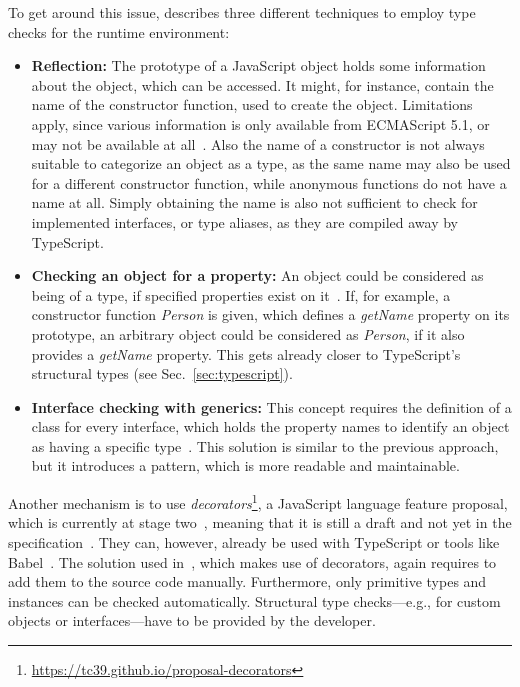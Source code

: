 \pagebreak
\noindent
To get around this issue, \citeauthor{MasteringTypeScript:Rozentals:2015} describes three different techniques to employ type checks for the runtime environment:
\begin{itemize}
  \item \textbf{Reflection:} The prototype of a JavaScript object holds 
some information about the object, which can be accessed. It might, for instance, contain the name of the constructor function, used to create the object. Limitations apply, since various information is only available from ECMAScript 5.1, or may not be available at all~\cite[pp.~98--100]{MasteringTypeScript:Rozentals:2015}. Also the name of a constructor is not always suitable to categorize an object as a type, as the same name may also be used for a different constructor function, while anonymous functions do not have a name at all. Simply obtaining the name is also not sufficient to check for implemented interfaces, or type aliases, as they are compiled away by TypeScript.
  \item \textbf{Checking an object for a property:} An object could be considered 
as being of a type, if specified properties exist on it~\cites[pp.~101--102]{MasteringTypeScript:Rozentals:2015}[pp.~18--20]{ProJavaScriptDesignPatterns:HarmesDiaz:2008}. If, for example, a constructor function \emph{Person} is given, which defines a \emph{getName} property on its prototype, an arbitrary object could be considered as \emph{Person}, if it also provides a \emph{getName} property. This gets already closer to TypeScript's structural types (see Sec.~\ref{sec:typescript}).
  \item \textbf{Interface checking with generics:} This concept requires the definition of a class for every interface, which holds the property names to identify an object as having a specific type~\cites[pp.~102--105]{MasteringTypeScript:Rozentals:2015}[pp.~17--19]{ProJavaScriptDesignPatterns:HarmesDiaz:2008}. This solution is similar to the previous approach, but it introduces a pattern, which is more readable and maintainable.
\end{itemize}

\noindent
Another mechanism is to use \textit{decorators}\footnote{\url{https://tc39.github.io/proposal-decorators}}, a JavaScript language feature proposal, which is currently at stage two~\cite{DecoratorsProposalRepo}, meaning that it is still a draft and not yet in the specification~\cite{EcmaScriptProposalProcess}. They can, however, already be used with TypeScript or tools like Babel~\cite{TypeScriptHandbook:Decorators, Babel:Plugins:Decorators}. The solution used in~\cite{DecoratorTypeChecks}, which makes use of decorators, again requires to add them to the source code manually. Furthermore, only primitive types and instances can be checked automatically. Structural type checks---e.g., for custom objects or interfaces---have to be provided by the developer.

